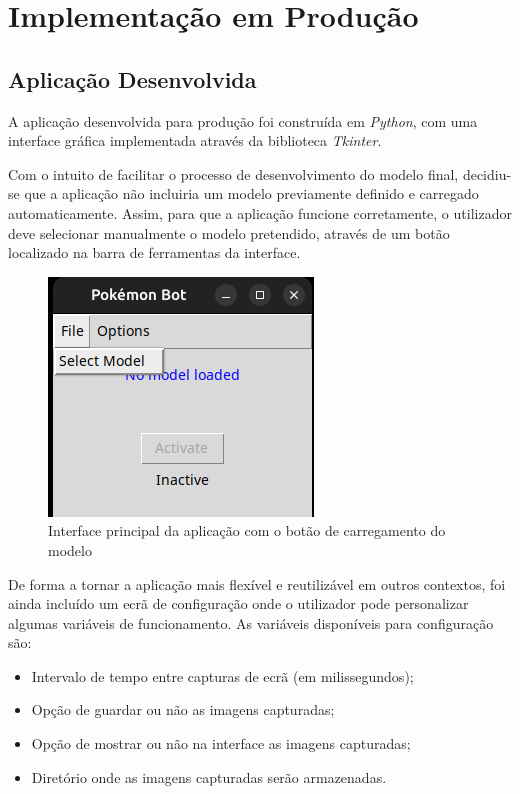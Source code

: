 \section{Implementação em Produção} \label{implementacao_producao}
\subsection{Aplicação Desenvolvida}

A aplicação desenvolvida para produção foi construída em \textit{Python}, com uma interface gráfica implementada através da biblioteca \textit{Tkinter}.

Com o intuito de facilitar o processo de desenvolvimento do modelo final, decidiu-se que a aplicação não incluiria um modelo previamente definido e carregado automaticamente. Assim, para que a aplicação funcione corretamente, o utilizador deve selecionar manualmente o modelo pretendido, através de um botão localizado na barra de ferramentas da interface.

\begin{figure}[ht]
    \centering
    \includegraphics[width=0.3\linewidth]{imagens/carregamento_modelo.png}
    \caption{Interface principal da aplicação com o botão de carregamento do modelo}
    \label{fig:carregamento_modelo}
\end{figure}

De forma a tornar a aplicação mais flexível e reutilizável em outros contextos, foi ainda incluído um ecrã de configuração onde o utilizador pode personalizar algumas variáveis de funcionamento. As variáveis disponíveis para configuração são:

\begin{itemize}
    \item Intervalo de tempo entre capturas de ecrã (em milissegundos);
    \item Opção de guardar ou não as imagens capturadas;
    \item Opção de mostrar ou não na interface as imagens capturadas;
    \item Diretório onde as imagens capturadas serão armazenadas.
\end{itemize}

